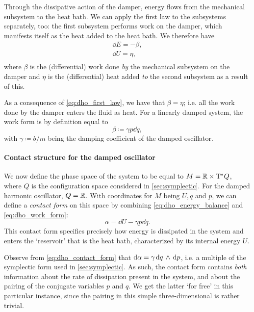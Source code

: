 Through the dissipative action of the damper, energy flows from the mechanical subsystem to the heat bath. We can apply the first law to the subsystems separately, too: the first subsystem performs work on the damper, which manifests itself as the heat added to the heat bath. We therefore have
\begin{equation}
    \begin{split}
        \dd{E}  = -\beta, \\[0.2cm]
        \dd{U} = \eta, \\
    \end{split}
    \label{eq:dho_energy_balance}
\end{equation}
where $\beta$ is the (differential) work done \emph{by} the mechanical subsystem on the damper and $\eta$ is the (differential) heat added \emph{to} the second subsystem as a result of this. 

As a consequence of \cref{eq:dho_first_law}, we have that $ \beta = \eta $; i.e. all the work done by the damper enters the fluid as heat. For a linearly damped system, the work form is by definition equal to 
\begin{equation}
    \beta \coloneq \gamma p \dd{q},
    \label{eq:dho_work_form}
\end{equation}
with $\gamma \coloneq b/m$ being the damping coefficient of the damped oscillator. 

\paragraph{Contact structure for the damped oscillator} We now define the phase space of the system to be equal to $M = \mathbb{R} \times \mathrm{T}^*Q$, where $Q$ is the configuration space considered in \cref{sec:symplectic}. For the damped harmonic oscillator, $Q = \mathbb{R}$. With coordinates for $M$ being $U, q$ and $p$, we can define a \emph{contact form} on this space by combining \cref{eq:dho_energy_balance} and \cref{eq:dho_work_form}: 
\begin{equation}
    \alpha = \dd{U} - \gamma p \dd{q}.
    \label{eq:dho_contact_form}
\end{equation}
This contact form specifies precisely how energy is dissipated in the system and enters the `reservoir' that is the heat bath, characterized by its internal energy $U$.

Observe from \cref{eq:dho_contact_form} that $\dd{\alpha} = \gamma  \dd{q}\,\wedge\,\dd{p} $, i.e. a multiple of the symplectic form used in \cref{sec:symplectic}. As such, the contact form contains \emph{both} information about the rate of dissipation present in the system, and about the pairing of the conjugate variables $p$ and $q$. We get the latter `for free' in this particular instance, since the pairing in this simple three-dimensional is rather trivial.

